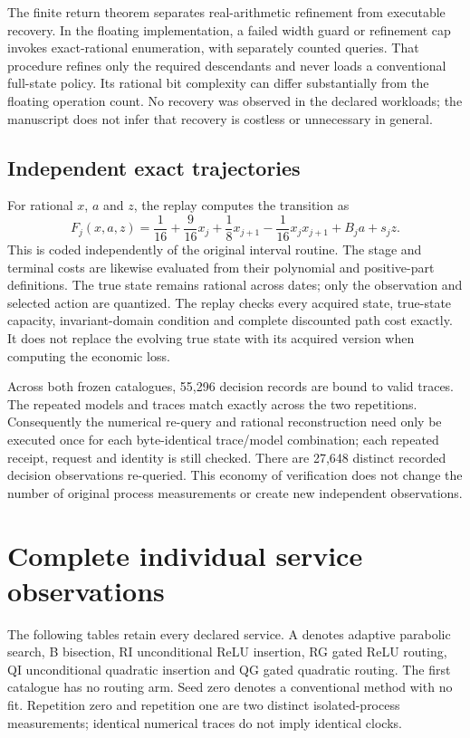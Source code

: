 The finite return theorem separates real-arithmetic refinement from executable recovery. In the floating implementation, a failed width guard or refinement cap invokes exact-rational enumeration, with separately counted queries. That procedure refines only the required descendants and never loads a conventional full-state policy. Its rational bit complexity can differ substantially from the floating operation count. No recovery was observed in the declared workloads; the manuscript does not infer that recovery is costless or unnecessary in general.

\subsection{Independent exact trajectories}
For rational $x$, $a$ and $z$, the replay computes the transition as
\[
 F_j(x,a,z)=\frac1{16}+\frac9{16}x_j+\frac18x_{j+1}
            -\frac1{16}x_jx_{j+1}+B_ja+s_jz.
\]
This is coded independently of the original interval routine. The stage and terminal costs are likewise evaluated from their polynomial and positive-part definitions. The true state remains rational across dates; only the observation and selected action are quantized. The replay checks every acquired state, true-state capacity, invariant-domain condition and complete discounted path cost exactly. It does not replace the evolving true state with its acquired version when computing the economic loss.

Across both frozen catalogues, 55,296 decision records are bound to valid traces. The repeated models and traces match exactly across the two repetitions. Consequently the numerical re-query and rational reconstruction need only be executed once for each byte-identical trace/model combination; each repeated receipt, request and identity is still checked. There are 27,648 distinct recorded decision observations re-queried. This economy of verification does not change the number of original process measurements or create new independent observations.

\section{Complete individual service observations}\label{supp:services65}
The following tables retain every declared service. A denotes adaptive parabolic search, B bisection, RI unconditional ReLU insertion, RG gated ReLU routing, QI unconditional quadratic insertion and QG gated quadratic routing. The first catalogue has no routing arm. Seed zero denotes a conventional method with no fit. Repetition zero and repetition one are two distinct isolated-process measurements; identical numerical traces do not imply identical clocks.

